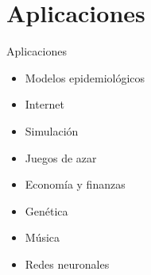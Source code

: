 \documentclass{beamer}
\begin{document}
\section{Aplicaciones}
\begin{frame}{Aplicaciones}
\begin{itemize}
\item Modelos epidemiológicos
\item Internet
\item Simulación
\item Juegos de azar
\item Economía y finanzas
\item Genética
\item Música
\item Redes neuronales
\end{itemize}
\end{frame}
\end{document}
